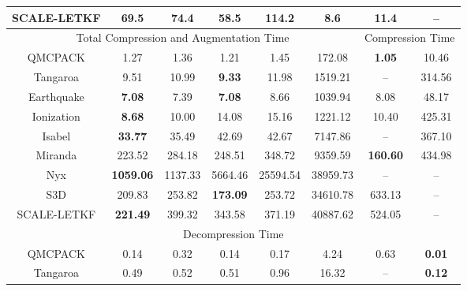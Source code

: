 \begin{table}[!t]
{\begin{tabular}{cccccccc}
SCALE-LETKF & 69.5             & 74.4    & 58.5            & \textbf{114.2} & \multicolumn{1}{c|}{8.6}        & 11.4               & --              \\ \hline
\multicolumn{6}{c|}{Total Compression and Augmentation Time}                                                  & \multicolumn{2}{c}{Compression Time} \\ \hline
QMCPACK     & 1.27             & 1.36    & 1.21            & 1.45           & \multicolumn{1}{c|}{172.08}     & \textbf{1.05}      & 10.46           \\
Tangaroa    & 9.51             & 10.99   & \textbf{9.33}   & 11.98          & \multicolumn{1}{c|}{1519.21}    & --                 & 314.56          \\
Earthquake  & \textbf{7.08}    & 7.39    & \textbf{7.08}   & 8.66           & \multicolumn{1}{c|}{1039.94}    & 8.08               & 48.17           \\
Ionization  & \textbf{8.68}    & 10.00   & 14.08           & 15.16          & \multicolumn{1}{c|}{1221.12}    & 10.40              & 425.31          \\
Isabel      & \textbf{33.77}   & 35.49   & 42.69           & 42.67          & \multicolumn{1}{c|}{7147.86}    & --                 & 367.10          \\
Miranda     & 223.52           & 284.18  & 248.51          & 348.72         & \multicolumn{1}{c|}{9359.59}    & \textbf{160.60}    & 434.98          \\
Nyx         & \textbf{1059.06} & 1137.33 & 5664.46         & 25594.54       & \multicolumn{1}{c|}{38959.73}   & --                 & --              \\
S3D         & 209.83           & 253.82  & \textbf{173.09} & 253.72         & \multicolumn{1}{c|}{34610.78}   & 633.13             & --              \\
SCALE-LETKF & \textbf{221.49}  & 399.32  & 343.58          & 371.19         & \multicolumn{1}{c|}{40887.62}   & 524.05             & --              \\ \hline
\multicolumn{8}{c}{Decompression Time}                                                                                                               \\ \hline
QMCPACK     & 0.14             & 0.32    & 0.14            & 0.17           & \multicolumn{1}{c|}{4.24}       & 0.63               & \textbf{0.01}   \\
Tangaroa    & 0.49             & 0.52    & 0.51            & 0.96           & \multicolumn{1}{c|}{16.32}      & --                 & \textbf{0.12}   \\

\end{tabular}}
\end{table}
